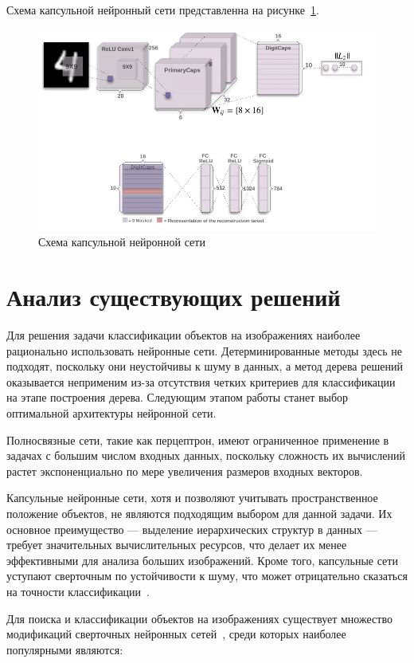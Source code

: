 \clearpage

Схема капсульной нейронный сети представленна на рисунке~\ref{capsnet_sheme}.

\begin{figure}[H]
    \centering
    \includegraphics[width=0.8\linewidth]{images/capsnet.png}
    \caption{Схема капсульной нейронной сети}
    \label{capsnet_sheme}
\end{figure}

\chapter{Анализ существующих решений}

Для решения задачи классификации объектов на изображениях наиболее рационально использовать нейронные сети. Детерминированные методы здесь не подходят, поскольку они неустойчивы к шуму в данных, а метод дерева решений оказывается неприменим из-за отсутствия четких критериев для классификации на этапе построения дерева. Следующим этапом работы станет выбор оптимальной архитектуры нейронной сети.

Полносвязные сети, такие как перцептрон, имеют ограниченное применение в задачах с большим числом входных данных, поскольку сложность их вычислений растет экспоненциально по мере увеличения размеров входных векторов.

Капсульные нейронные сети, хотя и позволяют учитывать пространственное положение объектов, не являются подходящим выбором для данной задачи. Их основное преимущество — выделение иерархических структур в данных — требует значительных вычислительных ресурсов, что делает их менее эффективными для анализа больших изображений. Кроме того, капсульные сети уступают сверточным по устойчивости к шуму, что может отрицательно сказаться на точности классификации~\cite{capsnet_minus}.

Для поиска и классификации объектов на изображениях существует множество модификаций сверточных нейронных сетей~\cite{cnn_types}, среди которых наиболее популярными являются:

